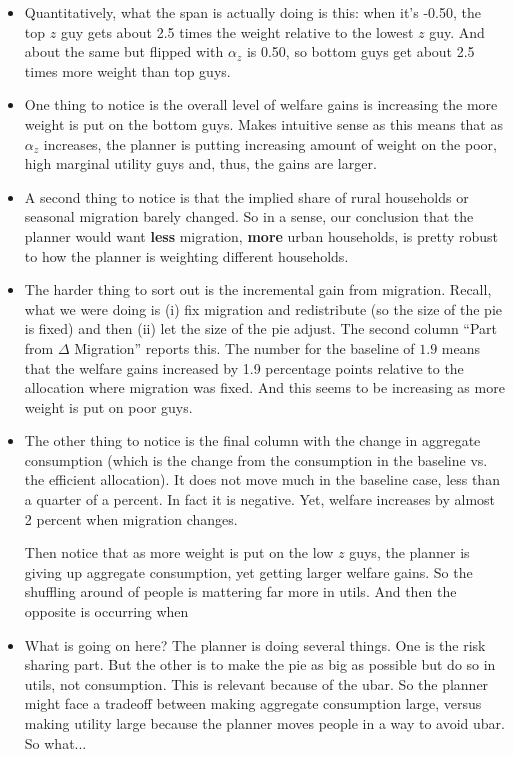 \documentclass[12pt,pdftex]{article}
\begin{document}
\begin{onehalfspacing}
\begin{itemize}
\item Quantitatively, what the span is actually doing is this: when it's -0.50, the top $z$ guy gets about 2.5 times the weight relative to the lowest $z$ guy. And about the same but flipped with $\alpha_z$ is 0.50, so bottom guys get about 2.5 times more weight than top guys.

\item One thing to notice is the overall level of welfare gains is increasing the more weight is put on the bottom guys. Makes intuitive sense as this means that as $\alpha_z$ increases, the planner is putting increasing amount of weight on the poor, high marginal utility guys and, thus, the gains are larger.

\item A second thing to notice is that the implied share of rural households or seasonal migration barely changed. So in a sense, our conclusion that the planner would want \textbf{less} migration, \textbf{more} urban households, is pretty robust to how the planner is weighting different households.

\item The harder thing to sort out is the incremental gain from migration. Recall, what we were doing is (i) fix migration and redistribute (so the size of the pie is fixed) and then (ii) let the size of the pie adjust. The second column ``Part from $\Delta$ Migration'' reports this. The number for the baseline of $1.9$ means that the welfare gains increased by 1.9 percentage points relative to the allocation where migration was fixed. And this seems to be increasing as more weight is put on poor guys. 

\item The other thing to notice is the final column with the change in aggregate consumption (which is the change from the consumption in the baseline vs. the efficient allocation).  It does not move much in the baseline case, less than a quarter of a percent. In fact it is negative. Yet, welfare increases by almost 2 percent when migration changes.

    Then notice that as more weight is put on the low $z$ guys, the planner is giving up aggregate consumption, yet getting larger welfare gains. So the shuffling around of people is mattering far more in utils. And then the opposite is occurring when
    
\item What is going on here? The planner is doing several things. One is the risk sharing part. But the other is to make the pie as big as possible but do so in utils, not consumption. This is relevant because of the ubar. So the planner might face a tradeoff between making aggregate consumption large, versus making utility large because the planner moves people in a way to avoid ubar. So what...


\end{itemize}
\end{onehalfspacing}
\end{document}
